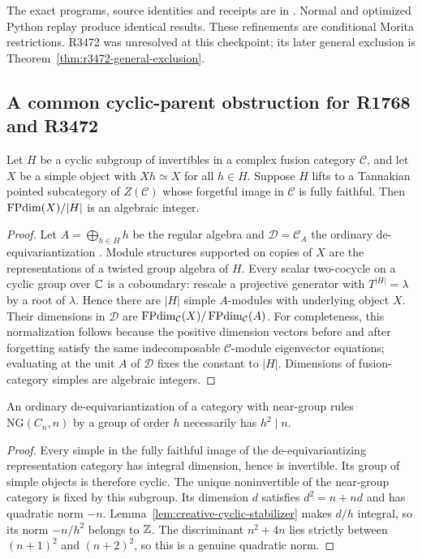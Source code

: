The exact programs, source identities and receipts are in
. Normal and optimized
Python replay produce identical results. These refinements are
conditional Morita restrictions. R3472 was unresolved at this checkpoint; its later general exclusion is Theorem~\ref{thm:r3472-general-exclusion}.

\subsection{A common cyclic-parent obstruction for R1768 and R3472}
\label{subsec:creative-cyclic-parent}

\begin{lemma}
\label{lem:creative-cyclic-stabilizer}
Let $H$ be a cyclic subgroup of invertibles in a complex fusion category
$\mathcal C$, and let $X$ be a simple object with $Xh\simeq X$ for all
$h\in H$. Suppose $H$ lifts to a Tannakian pointed subcategory of
$Z(\mathcal C)$ whose forgetful image in $\mathcal C$ is fully faithful.
Then $\operatorname{FPdim}(X)/|H|$ is an algebraic integer.
\end{lemma}
\begin{proof}
Let $A=\bigoplus_{h\in H}h$ be the regular algebra and
$\mathcal D=\mathcal C_A$ the ordinary de-equivariantization
\cite[Theorem~8.23.3]{EGNO}. Module structures supported on copies
of $X$ are the representations of a twisted group algebra of $H$.
Every scalar two-cocycle on a cyclic group over $\mathbb C$ is a coboundary:
rescale a projective generator with $T^{|H|}=\lambda$ by a root of
$\lambda$. Hence there are $|H|$ simple $A$-modules with underlying
object $X$. Their dimensions in $\mathcal D$ are
$\operatorname{FPdim}_{\mathcal C}(X)/\operatorname{FPdim}_{\mathcal C}(A)$.
For completeness, this normalization follows because the positive
dimension vectors before and after forgetting satisfy the same
indecomposable $\mathcal C$-module eigenvector equations; evaluating
at the unit $A$ of $\mathcal D$ fixes the constant to $|H|$.
Dimensions of fusion-category simples are algebraic integers.
\end{proof}

\begin{corollary}
\label{cor:creative-ng-square}
An ordinary de-equivariantization of a category with near-group rules
$\mathrm{NG}(C_n,n)$ by a group of order $h$ necessarily has $h^2\mid n$.
\end{corollary}
\begin{proof}
Every simple in the fully faithful image of the de-equivariantizing
representation category has integral dimension, hence is invertible.
Its group of simple objects is therefore cyclic. The unique
noninvertible of the near-group category is fixed by this subgroup.
Its dimension $d$ satisfies $d^2=n+nd$ and has quadratic norm $-n$.
Lemma~\ref{lem:creative-cyclic-stabilizer} makes $d/h$ integral, so its
norm $-n/h^2$ belongs to $\mathbb Z$. The discriminant $n^2+4n$ lies strictly
between $(n+1)^2$ and $(n+2)^2$, so this is a genuine quadratic norm.
\end{proof}

